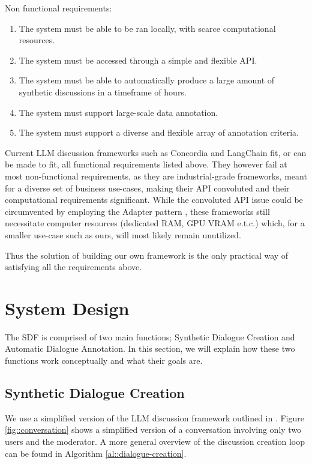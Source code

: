 Non functional requirements:
\begin{enumerate}
	\item The system must be able to be ran locally, with scarce computational resources.
	\item The system must be accessed through a simple and flexible API.
	\item The system must be able to automatically produce a large amount of synthetic discussions in a timeframe of hours.
	\item The system must support large-scale data annotation.
	\item The system must support a diverse and flexible array of annotation criteria.
\end{enumerate}

Current LLM discussion frameworks such as Concordia \cite{Vezhnevets2023GenerativeAM} and LangChain \cite{langchain} fit, or can be made to fit, all functional requirements listed above. They however fail at most non-functional requirements, as they are industrial-grade frameworks, meant for a diverse set of business use-cases, making their API convoluted and their computational requirements significant. While the convoluted API issue could be circumvented by employing the Adapter pattern \cite{gamma1995design}, these frameworks still necessitate computer resources (dedicated RAM, GPU VRAM e.t.c.) which, for a smaller use-case such as ours, will most likely remain unutilized.

Thus the solution of building our own framework is the only practical way of satisfying all the requirements above.



\section{System Design}
\label{sec:system:design-system}

The SDF is comprised of two main functions; Synthetic Dialogue Creation and Automatic Dialogue Annotation. In this section, we will explain how these two functions work conceptually and what their goals are.


\subsection{Synthetic Dialogue Creation}
\label{ssec:system:creation}

We use a simplified version of the LLM discussion framework outlined in \cite{abdelnabi2024cooperationcompetitionmaliciousnessllmstakeholders}. Figure \ref{fig::conversation} shows a simplified version of a conversation involving only two users and the moderator. A more general overview of the discussion creation loop can be found in Algorithm \ref{al::dialogue-creation}.

